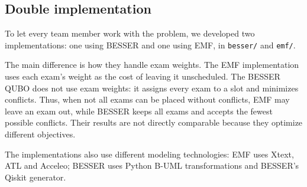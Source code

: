 \subsection{Double implementation}\label{sec:models-comparison}

To let every team member work with the problem, we developed two implementations: one using BESSER and one using
EMF, in \texttt{besser/} and \texttt{emf/}.

The main difference is how they handle exam weights. The EMF implementation uses each exam's weight as the cost of
leaving it unscheduled. The BESSER QUBO does not use exam weights: it assigns every exam to a slot and minimizes
conflicts. Thus, when not all exams can be placed without conflicts, EMF may leave an exam out, while BESSER keeps
all exams and accepts the fewest possible conflicts. Their results are not directly comparable because they
optimize different objectives.

The implementations also use different modeling technologies: EMF uses Xtext, ATL and Acceleo; BESSER uses
Python B-UML transformations and BESSER's Qiskit generator.
